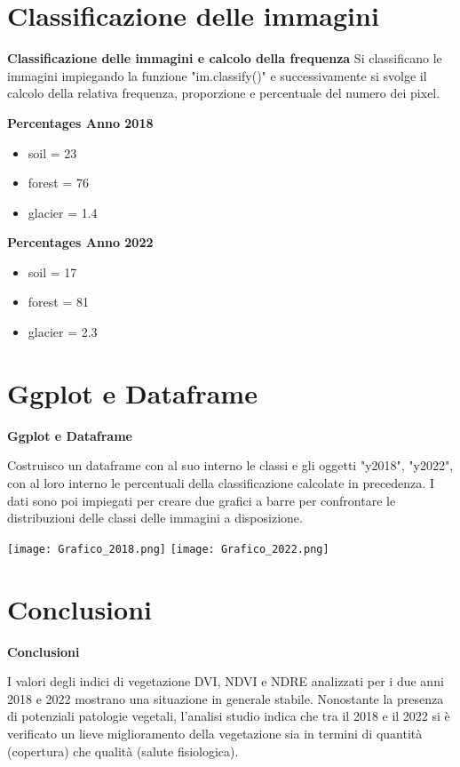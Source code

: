 \documentclass{beamer}
\begin{document}
\section{Classificazione delle immagini}

\begin{frame}
{\Large\textbf{Classificazione delle immagini e calcolo della frequenza}}
\vspace{-1cm}
Si classificano le immagini impiegando la funzione "im.classify()" e successivamente si svolge il calcolo della relativa frequenza, proporzione e percentuale del numero dei pixel.


\vspace{+0.5cm}
\raggedright\textbf{Percentages Anno 2018}
\begin{itemize} 
\item soil = 23
\item forest = 76
\item glacier = 1.4
\end{itemize} 
\textbf{Percentages Anno 2022}
\begin{itemize} 
\item soil = 17
\item forest = 81
\item glacier = 2.3
\end{itemize} 
\end{frame}

\section{Ggplot e Dataframe}

\begin{frame}
{\Large\textbf{Ggplot e Dataframe}}

Costruisco un dataframe con al suo interno le classi e gli oggetti "y2018", "y2022", con al loro interno le percentuali della classificazione calcolate in precedenza.
I dati sono poi impiegati per creare due grafici a barre per confrontare le distribuzioni delle classi delle immagini a disposizione.


    \centering
    \texttt{[image: Grafico\_2018.png]}
    \texttt{[image: Grafico\_2022.png]}
\end{frame}
 
\section{Conclusioni}

\begin{frame}
{\Large\textbf{Conclusioni}}

I valori degli indici di vegetazione DVI, NDVI e NDRE analizzati per i due anni 2018 e 2022 mostrano una situazione in generale stabile.
Nonostante la presenza di potenziali patologie vegetali, l'analisi studio indica che tra il 2018 e il 2022 si è verificato un lieve miglioramento della vegetazione sia in termini di quantità (copertura) che qualità (salute fisiologica).
\end{frame}
\end{document}
